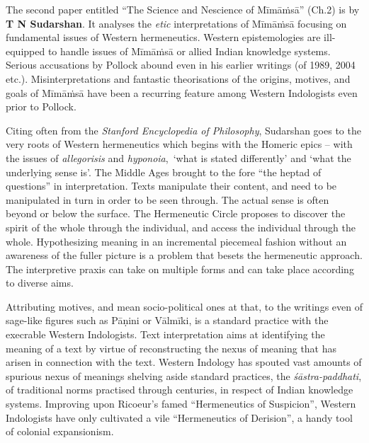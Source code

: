 The second paper entitled “The Science and Nescience of Mīmāṁsā” (Ch.2) is by \textbf{T N Sudarshan}. It analyses the \textit{etic} interpretations of Mīmāṁsā focusing on fundamental issues of Western hermeneutics. Western epistemologies are ill-equipped to handle issues of Mīmāṁsā or allied Indian knowledge systems. Serious accusations by Pollock abound even in his earlier writings (of 1989, 2004 etc.). Misinterpretations and fantastic theorisations of the origins, motives, and goals of Mīmāṁsā have been a recurring feature among Western Indologists even prior to Pollock. 

Citing often from the \textit{Stanford Encyclopedia of Philosophy}, Sudarshan goes to the very roots of Western hermeneutics which begins with the Homeric epics – with the issues of \textit{allegorisis} and \textit{hyponoia},\, ‘what is stated differently’ and ‘what the underlying sense is’. The Middle Ages brought to the fore “the heptad of questions” in interpretation. Texts manipulate their content, and need to be manipulated in turn in order to be seen through. The actual sense is often beyond or below the surface. The Hermeneutic Circle proposes to discover the spirit of the whole through the individual, and access the individual through the whole. Hypothesizing meaning in an incremental piecemeal fashion without an awareness of the fuller picture is a problem that besets the hermeneutic approach. The interpretive praxis can take on multiple forms and can take place according to diverse aims.

 Attributing motives, and mean socio-political ones at that, to the writings even of sage-like figures such as Pāṇini or Vālmīki, is a standard practice with the execrable Western Indologists. Text interpretation aims at identifying the meaning of a text by virtue of reconstructing the nexus of meaning that has arisen in connection with the text. Western Indology has spouted vast amounts of spurious nexus of meanings shelving aside standard practices, the \textit{śāstra-paddhati}, of traditional norms practised through centuries, in respect of Indian knowledge systems. Improving upon Ricoeur’s famed “Hermeneutics of Suspicion”, Western Indologists have only cultivated a vile “Hermeneutics of Derision”, a handy tool of colonial expansionism. 

